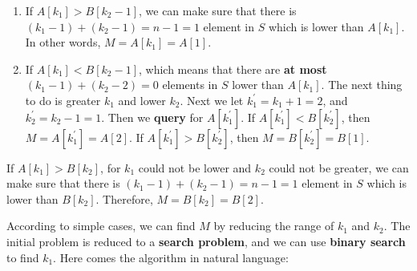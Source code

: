 \documentclass{article}
\begin{document}
    \begin{enumerate}
        \item If $A[k_1] > B[k_2 - 1]$, we can make sure that there is $(k_{1} - 1) + (k_{2} - 1) = n - 1 = 1$ element in $S$ which is lower than $A[k_1]$. In other words, $M = A[k_{1}] = A[1]$.
        \item If $A[k_1] < B[k_2 - 1]$, which means that there are \textbf{at most} $(k_1 - 1) + (k_2 - 2) = 0$ elements in $S$ lower than $A[k_1]$. The next thing to do is greater $k_{1}$ and lower $k_{2}$. Next we let $k^\prime_{1} = k_1 + 1 = 2$, and $k^\prime_{2} = k_2 - 1 = 1$. Then we \textbf{query} for $A[k^\prime_{1}]$. If $A[k^\prime_{1}] < B[k^\prime_{2}]$, then $M = A[k^\prime_{1}] = A[2]$. If $A[k^\prime_{1}] > B[k^\prime_{2}]$, then $M = B[k^\prime_{2}] = B[1]$.
    \end{enumerate}

    If $A[k_1] > B[k_2]$, for $k_{1}$ could not be lower and $k_{2}$ could not be greater, we can make sure that there is $(k_{1} - 1) + (k_{2} - 1) = n - 1 = 1$ element in $S$ which is lower than $B[k_2]$. Therefore, $M = B[k_{2}] = B[2]$. 

    According to simple cases, we can find $M$ by reducing the range of $k_{1}$ and $k_{2}$. The initial problem is reduced to a \textbf{search problem}, and we can use \textbf{binary search} to find $k_{1}$. Here comes the algorithm in natural language:
\end{document}
